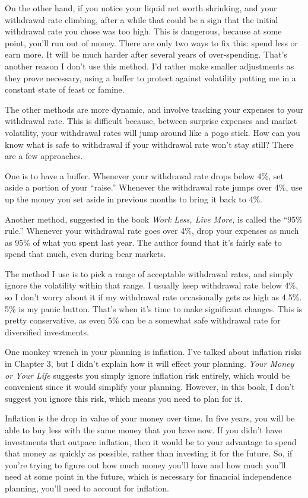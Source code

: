 On the other hand, if you notice your liquid net worth shrinking, and your withdrawal rate climbing, after a while that could be a sign that the initial withdrawal rate you chose was too high. This is dangerous, because at some point, you'll run out of money. There are only two ways to fix this: spend less or earn more. It will be much harder after several years of over-spending. That's another reason I don't use this method. I'd rather make smaller adjustments as they prove necessary, using a buffer to protect against volatility putting me in a constant state of feast or famine.

The other methods are more dynamic, and involve tracking your expenses to your withdrawal rate. This is difficult because, between surprise expenses and market volatility, your withdrawal rates will jump around like a pogo stick. How can you know what is safe to withdrawal if your withdrawal rate won't stay still? There are a few approaches.

One is to have a buffer. Whenever your withdrawal rate drops below 4\%, set aside a portion of your ``raise.'' Whenever the withdrawal rate jumps over 4\%, use up the money you set aside in previous months to bring it back to 4\%.

Another method, suggested in the book \emph{Work Less, Live More,} is called the ``95\% rule.'' Whenever your withdrawal rate goes over 4\%, drop your expenses as much as 95\% of what you spent last year. The author found that it's fairly safe to spend that much, even during bear markets.

The method I use is to pick a range of acceptable withdrawal rates, and simply ignore the volatility within that range. I usually keep withdrawal rate below 4\%, so I don't worry about it if my withdrawal rate occasionally gets as high as 4.5\%. 5\% is my panic button. That's when it's time to make significant changes. This is pretty conservative, as even 5\% can be a somewhat safe withdrawal rate for diversified investments.

One monkey wrench in your planning is inflation. I've talked about inflation risks in Chapter 3, but I didn't explain how it will effect your planning. \emph{Your Money or Your Life} suggests you simply ignore inflation risk entirely, which would be convenient since it would simplify your planning. However, in this book, I don't suggest you ignore this risk, which means you need to plan for it.

Inflation is the drop in value of your money over time. In five years, you will be able to buy less with the same money that you have now. If you didn't have investments that outpace inflation, then it would be to your advantage to spend that money as quickly as possible, rather than investing it for the future. So, if you're trying to figure out how much money you'll have and how much you'll need at some point in the future, which is necessary for financial independence planning, you'll need to account for inflation.

